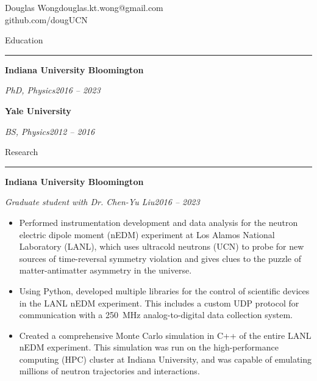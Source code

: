 \newpage
\pagestyle{empty} %
\begin{singlespace}
{\parindent0pt %
{\large Douglas Wong}\hfill{douglas.kt.wong@gmail.com}\\ \null \hfill{github.com/dougUCN}

\vspace{\baselineskip}
{\large Education}\vspace{0.25\baselineskip}\hrule\vspace{0.75\baselineskip}

\textbf{Indiana University Bloomington}

\textit{PhD, Physics}\hfill\textit{2016 -- 2023}

\vspace{\baselineskip}

\textbf{Yale University}

\textit{BS, Physics}\hfill\textit{2012 -- 2016}

\vspace{\baselineskip}
{\large Research} \vspace{0.25\baselineskip}\hrule\vspace{0.75\baselineskip}

\textbf{Indiana University Bloomington}

\textit{Graduate student with Dr. Chen-Yu Liu}\hfill\textit{2016 -- 2023}
\begin{itemize}[noitemsep,topsep=0pt]
    \item Performed instrumentation development and data analysis for the neutron electric dipole moment (nEDM) experiment at Los Alamos National Laboratory (LANL), which uses ultracold neutrons (UCN) to probe for new sources of time-reversal symmetry violation and gives clues to the puzzle of matter-antimatter asymmetry in the universe.
    \item Using Python, developed multiple libraries for the control of scientific devices in the LANL nEDM experiment. This includes a custom UDP protocol for communication with a \qty{250}{MHz} analog-to-digital data collection system.
    \item Created a comprehensive Monte Carlo simulation in C++ of the entire LANL nEDM experiment. This simulation was run on the high-performance computing (HPC) cluster at Indiana University, and was capable of emulating millions of neutron trajectories and interactions.
\end{itemize}

}
\end{singlespace}
